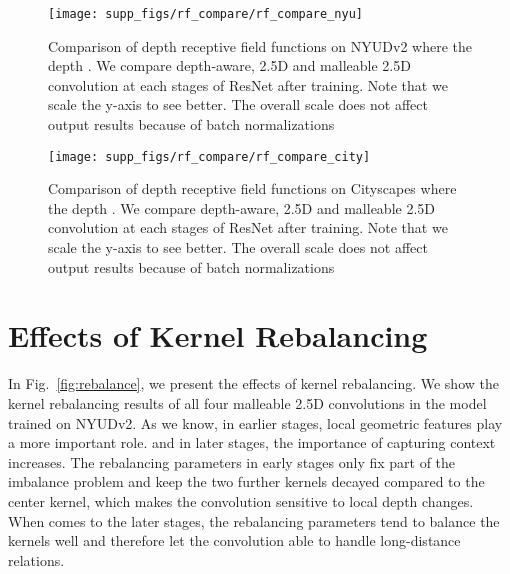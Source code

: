 \documentclass[runningheads]{llncs}
\begin{document}
\begin{figure}[htbp]
  \centering
  \texttt{[image: supp\_figs/rf\_compare/rf\_compare\_nyu]}
  \caption{
  Comparison of depth receptive field functions  on NYUDv2 where the depth .
  We compare depth-aware, 2.5D and malleable 2.5D convolution at each stages of ResNet after training.
  Note that we scale the y-axis to see better.
  The overall scale does not affect output results because of batch normalizations
  }
  \label{fig:rf_compare_nyu}
\end{figure}

\begin{figure}[htbp]
  \centering
  \texttt{[image: supp\_figs/rf\_compare/rf\_compare\_city]}
  \caption{
  Comparison of depth receptive field functions  on Cityscapes where the depth .
  We compare depth-aware, 2.5D and malleable 2.5D convolution at each stages of ResNet after training.
  Note that we scale the y-axis to see better.
  The overall scale does not affect output results because of batch normalizations
  }
  \label{fig:rf_compare_city}
\end{figure}

\section{Effects of Kernel Rebalancing}
In Fig.~\ref{fig:rebalance}, we present the effects of kernel rebalancing.
We show the kernel rebalancing results of all four malleable 2.5D convolutions in the model trained on NYUDv2.
As we know,
in earlier stages, local geometric features play a more important role.
and in later stages, the importance of capturing context increases.
The rebalancing parameters in early stages only fix part of the imbalance problem and keep the two further kernels decayed compared to the center kernel, which makes the convolution sensitive to local depth changes.
When comes to the later stages, the rebalancing parameters tend to balance the kernels well and therefore let the convolution able to handle long-distance relations.
\end{document}
